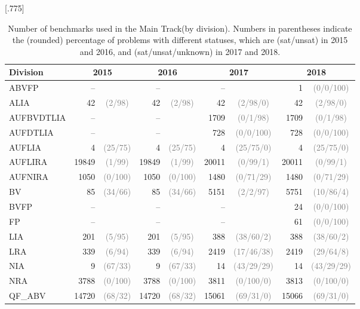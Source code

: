 \documentclass[dvipsnames,table,twoside,11pt]{article}
\newcommand{\maintrack}{Main Track\xspace}
\newcommand{\gray}[1]{\textcolor{gray}{#1}}
\begin{document}
\begin{table}
  \caption{Number of benchmarks used in the \maintrack (by division). Numbers in parentheses indicate the (rounded) percentage of problems with different statuses, which are (sat/unsat) in 2015 and 2016, and (sat/unsat/unknown) in 2017 and 2018.}
  \label{table:benchmarks-main-track}
  \centering
  \scalebox{.9}[.775]{\begin{tabular}{lr@{\hskip3pt}cr@{\hskip3pt}cr@{\hskip3pt}cr@{\hskip3pt}c}
    \toprule
    Division & \multicolumn{2}{c}{2015} & \multicolumn{2}{c}{2016} & \multicolumn{2}{c}{2017} & \multicolumn{2}{c}{2018} \\
    \midrule
    ABVFP & -- & & -- & & -- & & 1 & \gray{(0/0/100)}\\
    ALIA & 42 & \gray{(2/98)} & 42 & \gray{(2/98)} & 42 & \gray{(2/98/0)} & 42 & \gray{(2/98/0)}\\
    AUFBVDTLIA & -- & & -- & & 1709 & \gray{(0/1/98)} & 1709 & \gray{(0/1/98)}\\
    AUFDTLIA & -- & & -- & & 728 & \gray{(0/0/100)} & 728 & \gray{(0/0/100)}\\
    AUFLIA & 4 & \gray{(25/75)} & 4 & \gray{(25/75)} & 4 & \gray{(25/75/0)} & 4 & \gray{(25/75/0)}\\
    AUFLIRA & 19849 & \gray{(1/99)} & 19849 & \gray{(1/99)} & 20011 & \gray{(0/99/1)} & 20011 & \gray{(0/99/1)}\\
    AUFNIRA & 1050 & \gray{(0/100)} & 1050 & \gray{(0/100)} & 1480 & \gray{(0/71/29)} & 1480 & \gray{(0/71/29)}\\
    BV & 85 & \gray{(34/66)} & 85 & \gray{(34/66)} & 5151 & \gray{(2/2/97)} & 5751 & \gray{(10/86/4)}\\
    BVFP & -- & & -- & & -- & & 24 & \gray{(0/0/100)}\\
    FP & -- & & -- & & -- & & 61 & \gray{(0/0/100)}\\
    LIA & 201 & \gray{(5/95)} & 201 & \gray{(5/95)} & 388 & \gray{(38/60/2)} & 388 & \gray{(38/60/2)}\\
    LRA & 339 & \gray{(6/94)} & 339 & \gray{(6/94)} & 2419 & \gray{(17/46/38)} & 2419 & \gray{(29/64/8)}\\
    NIA & 9 & \gray{(67/33)} & 9 & \gray{(67/33)} & 14 & \gray{(43/29/29)} & 14 & \gray{(43/29/29)}\\
    NRA & 3788 & \gray{(0/100)} & 3788 & \gray{(0/100)} & 3811 & \gray{(0/100/0)} & 3813 & \gray{(0/100/0)}\\
    QF\_ABV & 14720 & \gray{(68/32)} & 14720 & \gray{(68/32)} & 15061 & \gray{(69/31/0)} & 15066 & \gray{(69/31/0)}\\

\end{tabular}}
\end{table}
\end{document}
